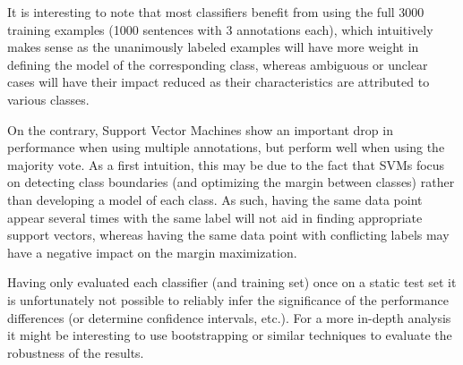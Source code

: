 \documentclass[11pt,letterpaper]{article}
\begin{document}
It is interesting to note that most classifiers benefit from using the full 3000 training examples (1000 sentences with 3 annotations each), which intuitively makes sense as the unanimously labeled examples will have more weight in defining the model of the corresponding class, whereas ambiguous or unclear cases will have their impact reduced as their characteristics are attributed to various classes.

On the contrary, Support Vector Machines show an important drop in performance when using multiple annotations, but perform well when using the majority vote.  As a first intuition, this may be due to the fact that SVMs focus on detecting class boundaries (and optimizing the margin between classes) rather than developing a model of each class.  As such, having the same data point appear several times with the same label will not aid in finding appropriate support vectors, whereas having the same data point with conflicting labels may have a negative impact on the margin maximization.

Having only evaluated each classifier (and training set) once on a static test set it is unfortunately not possible to reliably infer the significance of the performance differences (or determine confidence intervals, etc.).  For a more in-depth analysis it might be interesting to use bootstrapping or similar techniques to evaluate the robustness of the results.
\end{document}
